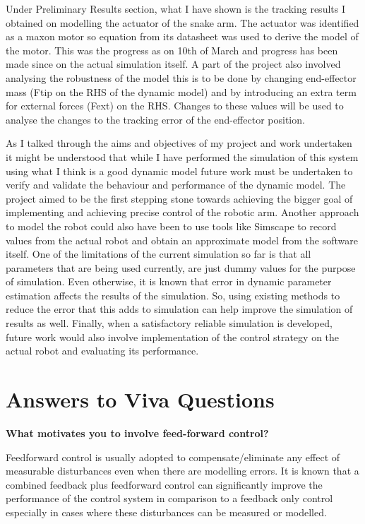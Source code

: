 \documentclass[a4paper,12pt]{article}
\begin{document}
Under Preliminary Results section, what I have shown is the tracking results I obtained on modelling the actuator of the snake arm. The actuator was identified as a maxon motor so equation from its datasheet was used to derive the model of the motor. This was the progress as on 10th of March and progress has been made since on the actual simulation itself. A part of the project also involved analysing the robustness of the model this is to be done by changing end-effector mass (Ftip on the RHS of the dynamic model) and by introducing an extra term for external forces (Fext) on the RHS. Changes to these values will be used to analyse the changes to the tracking error of the end-effector position.

As I talked through the aims and objectives of my project and work undertaken it might be understood that while I have performed the simulation of this system using what I think is a good dynamic model future work must be undertaken to verify and validate the behaviour and performance of the dynamic model. The project aimed to be the first stepping stone towards achieving the bigger goal of implementing and achieving precise control of the robotic arm. Another approach to model the robot could also have been to use tools like Simscape to record values from the actual robot and obtain an approximate model from the software itself. One of the limitations of the current simulation so far is that all parameters that are being used currently, are just dummy values for the purpose of simulation. Even otherwise, it is known that error in dynamic parameter estimation affects the results of the simulation. So, using existing methods to reduce the error that this adds to simulation can help improve the simulation of results as well. Finally, when a satisfactory reliable simulation is developed, future work would also involve implementation of the control strategy on the actual robot and evaluating its performance.


\section{Answers to Viva Questions}
\textbf{What motivates you to involve feed-forward control?}

Feedforward control is usually adopted to compensate/eliminate any effect of measurable disturbances even when there are modelling errors. It is known that a combined feedback plus feedforward control can significantly improve the performance of the control system in comparison to a feedback only control especially in cases where these disturbances can be measured or modelled. 
\end{document}

